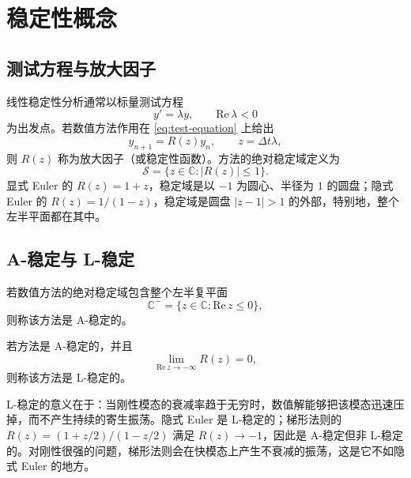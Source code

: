 \section{稳定性概念}
\label{sec:stability}

\subsection{测试方程与放大因子}

线性稳定性分析通常以标量测试方程
\begin{equation}
  y'=\lambda y,\qquad \mathrm{Re}\,\lambda<0
  \label{eq:test-equation}
\end{equation}
为出发点。若数值方法作用在 \eqref{eq:test-equation} 上给出
\begin{equation}
  y_{n+1}=R(z)y_n,\qquad z=\Delta t\lambda,
  \label{eq:amplification}
\end{equation}
则 $R(z)$ 称为放大因子（或稳定性函数）。方法的绝对稳定域定义为
\begin{equation}
  \mathcal{S}=\{z\in\mathbb{C}: |R(z)|\le1\}.
  \label{eq:stability-region}
\end{equation}
显式 Euler 的 $R(z)=1+z$，稳定域是以 $-1$ 为圆心、半径为 $1$ 的圆盘；隐式 Euler 的 $R(z)=1/(1-z)$，稳定域是圆盘 $|z-1|>1$ 的外部，特别地，整个左半平面都在其中。

\subsection{A-稳定与 L-稳定}

\begin{definition}[A-稳定]
  若数值方法的绝对稳定域包含整个左半复平面
  \begin{equation}
    \mathbb{C}^-=\{z\in\mathbb{C}:\mathrm{Re}\,z\le0\},
  \end{equation}
  则称该方法是 A-稳定的。
\end{definition}

\begin{definition}[L-稳定]
  若方法是 A-稳定的，并且
  \begin{equation}
    \lim_{\mathrm{Re}\,z\to-\infty}R(z)=0,
    \label{eq:L-stability}
  \end{equation}
  则称该方法是 L-稳定的。
\end{definition}

L-稳定的意义在于：当刚性模态的衰减率趋于无穷时，数值解能够把该模态迅速压掉，而不产生持续的寄生振荡。隐式 Euler 是 L-稳定的；梯形法则的 $R(z)=(1+z/2)/(1-z/2)$ 满足 $R(z)\to-1$，因此是 A-稳定但非 L-稳定的。对刚性很强的问题，梯形法则会在快模态上产生不衰减的振荡，这是它不如隐式 Euler 的地方。

